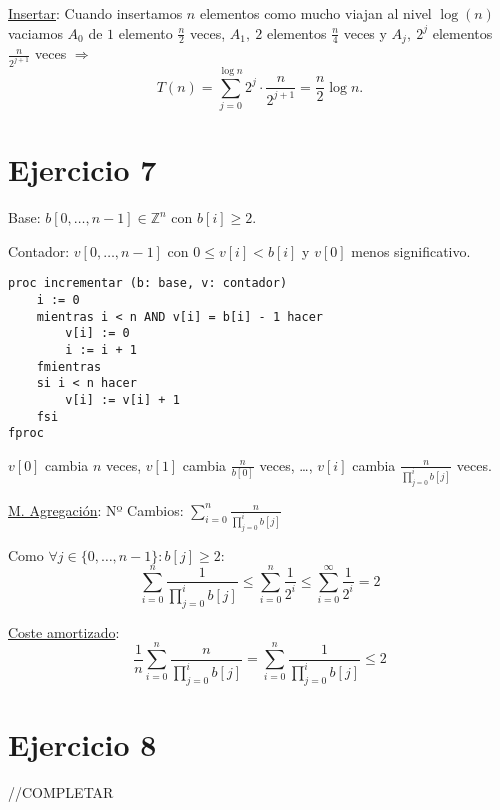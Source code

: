 \documentclass[10pt,a4paper,openright]{book}
\theoremstyle{break}
\begin{document}
\underline{Insertar}:
Cuando insertamos $n$ elementos como mucho viajan al nivel $\log\left( n \right)$ vaciamos $A_0$ de $1$ elemento $\frac{n}{2}$ veces, $A_1,\ 2$ elementos $\frac{n}{4}$ veces y $A_j,\ 2^j$ elementos $\frac{n}{2^{j+1}}$ veces $\Rightarrow$
\[
T\left( n \right) = \sum_{j=0}^{\log n} 2^j \cdot \frac{n}{2^{j+1}} = \frac{n}{2} \log n.
\]

\section{Ejercicio 7}%
\label{sec:ejercicio_7}
Base: $b\left[ 0, \ldots, n-1 \right] \in \mathbb{Z}^n$ con $b\left[ i \right] \ge 2$.

Contador: $v\left[ 0, \ldots, n-1 \right]$ con $0 \le v\left[ i \right] < b\left[ i \right]$ y $v\left[ 0 \right]$ menos significativo.

\begin{lstlisting}
proc incrementar (b: base, v: contador) 
    i := 0
    mientras i < n AND v[i] = b[i] - 1 hacer
        v[i] := 0
        i := i + 1
    fmientras
    si i < n hacer
        v[i] := v[i] + 1
    fsi
fproc
\end{lstlisting}
$v\left[ 0 \right]$ cambia $n$ veces, $v\left[ 1 \right]$ cambia $\frac{n}{b\left[ 0 \right]}$ veces, \ldots, $v\left[ i \right]$ cambia $\frac{n}{\prod_{j=0}^{i} b\left[ j \right]}$ veces.

\underline{M. Agregación}: 
Nº Cambios: $\sum_{i=0}^{n} \frac{n}{\prod_{j=0}^{i} b\left[ j \right]}$

Como $\forall j \in \{0, \ldots, n-1\}: b\left[ j \right] \ge 2$:
\[
\sum_{i=0}^{n} \frac{1}{\prod_{j=0}^{i} b\left[ j \right]} \le \sum_{i=0}^{n} \frac{1}{2^i} \le \sum_{i=0}^{\infty} \frac{1}{2^i} = 2  
\]

\underline{Coste amortizado}:
\[
\frac{1}{n} \sum_{i=0}^{n} \frac{n}{\prod_{j=0}^{i} b\left[ j \right]} = \sum_{i=0}^{n} \frac{1}{\prod_{j=0}^{i} b\left[ j \right]} \le 2   
\]

\section{Ejercicio 8}%
\label{sec:ejercicio_8}
//COMPLETAR
\end{document}

